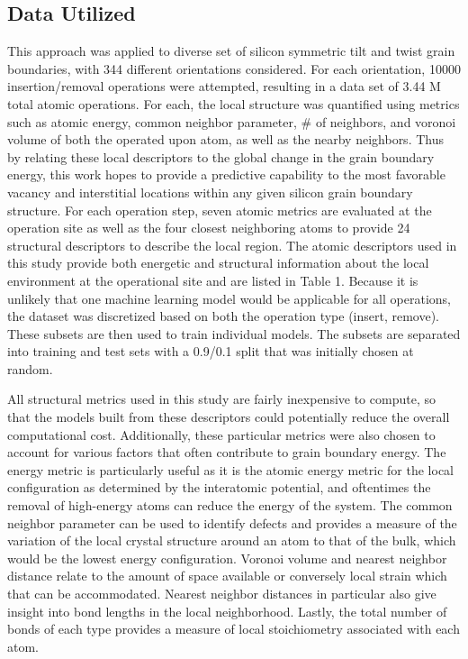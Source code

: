 \documentclass[aip,reprint,longbibliography,amsmath,amssymb,twocolumn,superscriptaddress]{revtex4-1}
\begin{document}
\subsection{Data Utilized}

This approach was applied to diverse set of silicon symmetric tilt and twist grain boundaries, with 344 different orientations considered.  For each orientation, 10000 insertion/removal operations were attempted, resulting in a data set of 3.44 M total atomic operations.  
%
For each, the local structure was quantified using metrics such as atomic energy, common neighbor parameter, \# of neighbors, and voronoi volume of both the operated upon atom, as well as the nearby neighbors.  
%
Thus by relating these local descriptors to the global change in the grain boundary energy, this work hopes to provide a predictive capability to the most favorable vacancy and interstitial locations within any given silicon grain boundary structure. 
%
For each operation step, seven atomic metrics are evaluated at the operation site as well as the four closest neighboring atoms to provide 24 structural descriptors to describe the local region.  
%
The atomic descriptors used in this study provide both energetic and structural information about the local environment at the operational site and are listed in Table 1.  
%
Because it is unlikely that one machine learning model would be applicable for all operations, the dataset was discretized based on both the operation type (insert, remove). 
%
These subsets are then used to train individual models. 
%
The subsets are separated into training and test sets with a 0.9/0.1 split that was initially chosen at random.  
%


All structural metrics used in this study are fairly inexpensive to compute, so that the models built from these descriptors could potentially reduce the overall computational cost.  
%
Additionally, these particular metrics were also chosen to account for various factors that often contribute to grain boundary energy.  
%
The energy metric is particularly useful as it is the atomic energy metric for the local configuration as determined by the interatomic potential, and oftentimes the removal of high-energy atoms can reduce the energy of the system. 
%
The common neighbor parameter can be used to identify defects and provides a measure of the variation of the local crystal structure around an atom to that of the bulk, which would be the lowest energy configuration.  
%
Voronoi volume and nearest neighbor distance relate to the amount of space available or conversely local strain which that can be accommodated. 
%
Nearest neighbor distances in particular also give insight into bond lengths in the local neighborhood.  Lastly, the total number of bonds of each type provides a measure of local stoichiometry associated with each atom. 
\end{document}
